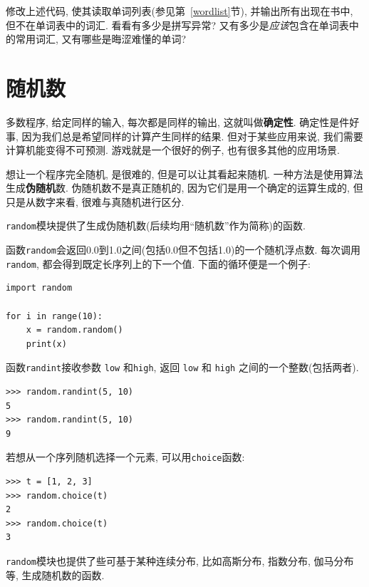 \documentclass[10pt]{book}
\begin{document}
\begin{exercise}

修改上述代码, 使其读取单词列表(参见第~\ref{wordlist}节), 
并输出所有出现在书中, 但不在单词表中的词汇. 
看看有多少是拼写异常? 又有多少是{\em 应该}包含在单词表中的常用词汇,
又有哪些是晦涩难懂的单词?

\end{exercise}


\section{随机数}

多数程序, 给定同样的输入, 每次都是同样的输出, 这就叫做{\bf 确定性}.
确定性是件好事, 因为我们总是希望同样的计算产生同样的结果. 
但对于某些应用来说, 我们需要计算机能变得不可预测. 
游戏就是一个很好的例子, 也有很多其他的应用场景. 

想让一个程序完全随机, 是很难的, 但是可以让其看起来随机. 
一种方法是使用算法生成{\bf 伪随机}数.
伪随机数不是真正随机的, 因为它们是用一个确定的运算生成的, 
但只是从数字来看, 很难与真随机进行区分. 

{\tt random}模块提供了生成伪随机数(后续均用``随机数''作为简称)的函数.

函数{\tt random}会返回0.0到1.0之间(包括0.0但不包括1.0)的一个随机浮点数. 
每次调用{\tt random}, 都会得到既定长序列上的下一个值. 
下面的循环便是一个例子:

\begin{verbatim}
import random

for i in range(10):
    x = random.random()
    print(x)
\end{verbatim}
%
函数{\tt randint}接收参数 {\tt low} 和{\tt high}, 
返回 {\tt low} 和 {\tt high} 之间的一个整数(包括两者). 

\begin{verbatim}
>>> random.randint(5, 10)
5
>>> random.randint(5, 10)
9
\end{verbatim}
%
若想从一个序列随机选择一个元素, 可以用{\tt choice}函数:

\begin{verbatim}
>>> t = [1, 2, 3]
>>> random.choice(t)
2
>>> random.choice(t)
3
\end{verbatim}
%
{\tt random}模块也提供了些可基于某种连续分布, 
比如高斯分布, 指数分布, 伽马分布等, 生成随机数的函数. 
\end{document}

